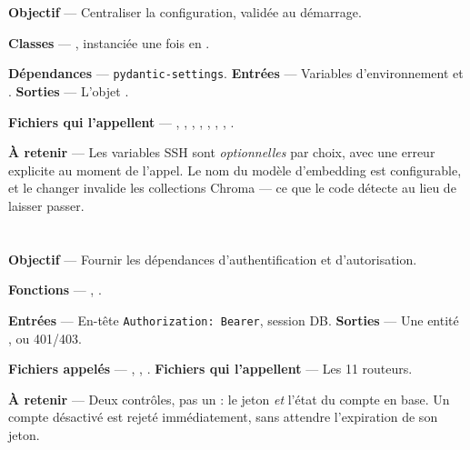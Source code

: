 \section{}

\textbf{Objectif} --- Centraliser la configuration, validée au démarrage.

\textbf{Classes} --- , instanciée une fois en
.

\textbf{Dépendances} --- \texttt{pydantic-settings}.
\textbf{Entrées} --- Variables d'environnement et .
\textbf{Sorties} --- L'objet .

\textbf{Fichiers qui l'appellent} --- , ,
, , ,
, ,
.

\textbf{À retenir} --- Les variables SSH sont \emph{optionnelles} par choix, avec
une erreur explicite au moment de l'appel. Le nom du modèle d'embedding est
configurable, et le changer invalide les collections Chroma --- ce que le code
détecte au lieu de laisser passer.

\section{}

\textbf{Objectif} --- Fournir les dépendances d'authentification et
d'autorisation.

\textbf{Fonctions} --- ,
.

\textbf{Entrées} --- En-tête \texttt{Authorization: Bearer}, session DB.
\textbf{Sorties} --- Une entité , ou  401/403.

\textbf{Fichiers appelés} --- ,
, .
\textbf{Fichiers qui l'appellent} --- Les 11 routeurs.

\textbf{À retenir} --- Deux contrôles, pas un : le jeton \emph{et} l'état du
compte en base. Un compte désactivé est rejeté immédiatement, sans attendre
l'expiration de son jeton.

